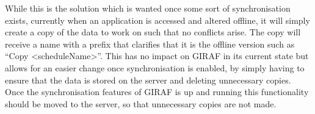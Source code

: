 \bigskip
While this is the solution which is wanted once some sort of synchronisation exists, currently when an application is accessed and altered offline, it will simply create a copy of the data to work on such that no conflicts arise.
The copy will receive a name with a prefix that clarifies that it is the offline version such as \enquote{Copy <scheduleName>}.
This has no impact on GIRAF in its current state but allows for an easier change once synchronisation is enabled, by simply having to ensure that the data is stored on the server and deleting unnecessary copies.
Once the synchronisation features of GIRAF is up and running this functionality should be moved to the server, so that unnecessary copies are not made.
